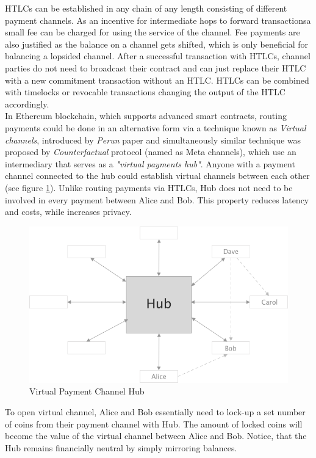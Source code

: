 \documentclass[a4paper,12pt]{article}
\begin{document}
HTLCs can be established in any chain of any length consisting of different 
payment channels. As an incentive for intermediate hops to forward transactionsa 
small fee can be charged for using the service of the channel. Fee payments are 
also justified as the balance on a channel gets shifted, which is only beneficial 
for balancing a lopsided channel. After a successful transaction with HTLCs, 
channel parties do not need to broadcast their contract and can just replace their
HTLC with a new commitment transaction without an HTLC. HTLCs can be combined with 
timelocks or revocable transactions changing the output of the HTLC accordingly.\\

In Ethereum blockchain, which supports advanced smart contracts, routing payments 
could be done in an alternative form via a technique known as \textit{Virtual 
channels}, introduced by \textit{Perun} paper \cite{perun} and simultaneously 
similar technique was proposed by \textit{Counterfactual} protocol (named as Meta 
channels), which use an intermediary that serves as a \textit{"virtual payments 
hub"}. Anyone with a payment channel connected to the hub could establish virtual
channels between each other (see figure \ref{img:hub}). Unlike routing payments 
via HTLCs, Hub does not need to be involved in every payment between Alice and 
Bob. This property reduces latency and costs, while increases privacy.

\begin{figure}[H]
    \centering
    \includegraphics[scale=0.5]{../img/hub}
    \caption{Virtual Payment Channel Hub}
    \label{img:hub}
\end{figure}

To open virtual channel, Alice and Bob essentially need to lock-up a set number
of coins from their payment channel with Hub. The amount of locked coins will 
become the value of the virtual channel between Alice and Bob. Notice, that the 
Hub remains financially neutral by simply mirroring balances.
\end{document}
